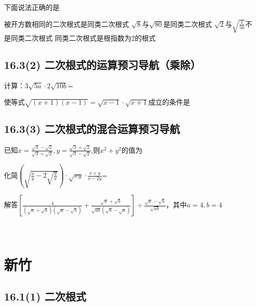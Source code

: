 \documentclass[answers]{exam}
\begin{document}
\begin{questions}

\question 下面说法正确的是
  \begin{choices}
  \choice 被开方数相同的二次根式是同类二次根式
  \choice $\sqrt{8}$与$\sqrt{80}$是同类二次根式
  \choice $\sqrt{2}$与$\sqrt{\frac{1}{50}}$不是同类二次根式
  \choice 同类二次根式是根指数为2的根式
  \end{choices}

\end{questions}

\subsection{16.3(2) 二次根式的运算预习导航（乘除）}

\begin{questions}
\question
计算：$3 \sqrt{5a} \cdot 2 \sqrt{10b}$=\fillin

\question
使等式$\sqrt{(x+1)(x-1)}=\sqrt{x-1} \cdot \sqrt{x+1}$成立的条件是\fillin

\end{questions}

\subsection{16.3(3) 二次根式的混合运算预习导航}

\begin{questions}

\question
已知$x=\frac{\sqrt{3}-\sqrt{2}}{\sqrt{3}+\sqrt{2}},y=\frac{\sqrt{3}+\sqrt{2}}{\sqrt{3}-\sqrt{2}}$,则$x^2+y^2$的值为\underline{\quad\quad}

\question
化简$(\sqrt{\frac{x}{y}-2\sqrt{\frac{y}{x}}}) \cdot \sqrt{xy} \cdot \frac{x+y}{x-2y}$=\underline{\quad\quad\quad\quad}

\question
解答$[\frac{4}{(\sqrt{a}+\sqrt{b})(\sqrt{a}-\sqrt{b})} + \frac{\sqrt{a}+\sqrt{b}}{\sqrt{ab}(\sqrt{b}-\sqrt{a})}] \div \frac{\sqrt{a}-\sqrt{b}}{\sqrt{ab}}$，其中$a=4,b=4$
  ~\\
  ~\\
  ~\\

\end{questions}   

\section{新竹}

\subsection{16.1(1) 二次根式}
\end{document}
